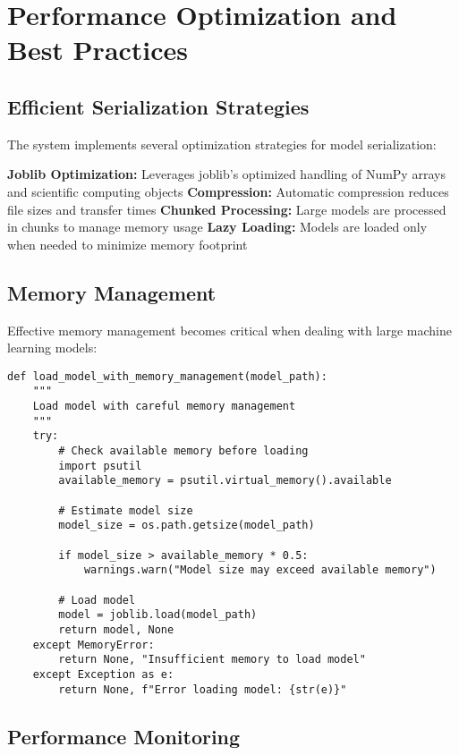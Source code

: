 \section{Performance Optimization and Best Practices}

\subsection{Efficient Serialization Strategies}

The system implements several optimization strategies for model serialization:

\textbf{Joblib Optimization:} Leverages joblib's optimized handling of NumPy arrays and scientific computing objects
\textbf{Compression:} Automatic compression reduces file sizes and transfer times
\textbf{Chunked Processing:} Large models are processed in chunks to manage memory usage
\textbf{Lazy Loading:} Models are loaded only when needed to minimize memory footprint

\subsection{Memory Management}

Effective memory management becomes critical when dealing with large machine learning models:

\begin{lstlisting}[language=MyPython, caption={Memory-Efficient Model Loading}]
def load_model_with_memory_management(model_path):
    """
    Load model with careful memory management
    """
    try:
        # Check available memory before loading
        import psutil
        available_memory = psutil.virtual_memory().available
        
        # Estimate model size
        model_size = os.path.getsize(model_path)
        
        if model_size > available_memory * 0.5:
            warnings.warn("Model size may exceed available memory")
        
        # Load model
        model = joblib.load(model_path)
        return model, None
    except MemoryError:
        return None, "Insufficient memory to load model"
    except Exception as e:
        return None, f"Error loading model: {str(e)}"
\end{lstlisting}

\subsection{Performance Monitoring}

